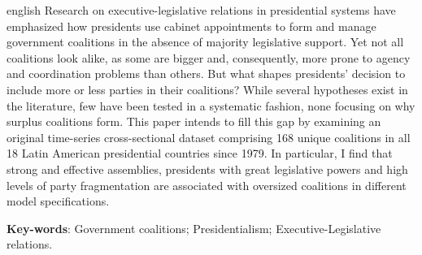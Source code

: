 \begin{resumo}[Abstract]
 \begin{otherlanguage*}{english}
Research on executive-legislative relations in presidential systems have emphasized how presidents use cabinet appointments to form and manage government coalitions in the absence of majority legislative support. Yet not all coalitions look alike, as some are bigger and, consequently, more prone to agency and coordination problems than others. But what shapes presidents' decision to include more or less parties in their coalitions? While several hypotheses exist in the literature, few have been tested in a systematic fashion, none focusing on why surplus coalitions form. This paper intends to fill this gap by examining an original time-series cross-sectional dataset comprising 168 unique coalitions in all 18 Latin American presidential countries since 1979. In particular, I find that strong and effective assemblies, presidents with great legislative powers and high levels of party fragmentation are associated with oversized coalitions in different model specifications.

\vspace{\onelineskip}
\noindent
\textbf{Key-words}: Government coalitions;  Presidentialism; Executive-Legislative relations.
 \end{otherlanguage*}
\end{resumo}